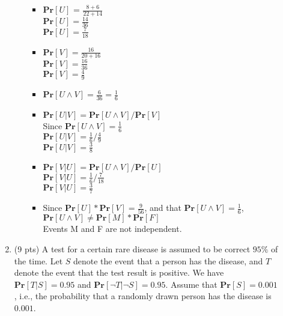 \documentclass[11pt]{article}
\renewcommand{\Pr}{\ensuremath{\mathbf{Pr}}\xspace}
\begin{document}
\begin{description}
\begin{enumerate}
\begin{enumerate}
\begin{itemize}
	\item
	$\Pr[U]$ = $\frac{8+6}{22+14}$ \\
	$\Pr[U] = \frac{14}{36}$ \\
	$\Pr[U] = \frac{7}{18}$ \\
	\item
	$\Pr[V] = \frac{16}{20+16}$ \\
	$\Pr[V] = \frac{16}{36}$ \\
	$\Pr[V] = \frac{4}{9}$ \\
	\item
	$\Pr[U \wedge V] = \frac{6}{36} = \frac{1}{6}$ \\
	\item
	$\Pr[U | V] = \Pr[U \wedge V] / \Pr[V]$ \\
	Since $\Pr[U \wedge V] = \frac{1}{6}$ \\
	$\Pr[U | V] = \frac{1}{6} / \frac{4}{9}$ \\
	$\Pr[U | V] = \frac{3}{8}$ \\
	\item
	$\Pr[V | U] = \Pr[U \wedge V] / \Pr[U]$ \\
	$\Pr[V | U] = \frac{1}{6} / \frac{7}{18}$ \\
	$\Pr[V | U] = \frac{3}{7}$ \\
	\item
	Since $\Pr[U] * \Pr[V] = \frac{9}{56}$, and that
	$\Pr[U \wedge V] = \frac{1}{6}$, \\
	$\Pr[U \wedge V] \neq \Pr[M] * \Pr[F]$ \\
	Events M and F are not independent. \\
	\end{itemize}
\end{enumerate}

 \item (9 pts)
A test for a certain rare disease is assumed to be correct $95\%$ of the time.  Let $S$ denote the event that a person has the disease, and $T$ denote the event that the test result is positive.  We have $\Pr[T|S]=0.95$ and $\Pr[\neg T| \neg S]=0.95$.  Assume that $\Pr[S]=0.001$, i.e., the probability that a randomly drawn person has the disease is $0.001$.


\end{enumerate}
\end{description}
\end{document}
